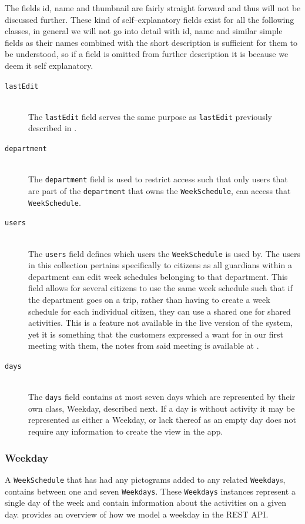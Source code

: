 \noindent
The fields id, name and thumbnail are fairly straight forward and thus will not be discussed further.
These kind of self--explanatory fields exist for all the following classes, in general we will not go into detail with id, name and similar simple fields as their names combined with the short description is sufficient for them to be understood, so if a field is omitted from further description it is because we deem it self explanatory.
\begin{description}
    \item [\texttt{lastEdit}] \hfill \\ 
    The \texttt{lastEdit} field serves the same purpose as \texttt{lastEdit} previously described in .
    \item [\texttt{department}] \hfill \\
    The \texttt{department} field is used to restrict access such that only users that are part of the \texttt{department} that owns the \texttt{WeekSchedule}, can access that \texttt{WeekSchedule}.
    \item [\texttt{users}] \hfill \\
    The \texttt{users} field defines which users the \texttt{WeekSchedule} is used by.
    The users in this collection pertains specifically to citizens as all guardians within a department can edit week schedules belonging to that department.
    This field allows for several citizens to use the same week schedule such that if the department goes on a trip, rather than having to create a week schedule for each individual citizen, they can use a shared one for shared activities.
    This is a feature not available in the live version of the system, yet it is something that the customers expressed a want for in our first meeting with them, the notes from said meeting is available at \citep{GIRAF20161stMeeting}.
    \item [\texttt{days}] \hfill \\
    The \texttt{days} field contains at most seven days which are represented by their own class, Weekday, described next.
    If a day is without activity it may be represented as either a Weekday, or lack thereof as an empty day does not require any information to create the view in the app.
\end{description}

\subsubsection{Weekday}
A \texttt{WeekSchedule} that has had any pictograms added to any related \texttt{Weekday}s, contains between one and seven \texttt{Weekdays}.
These \texttt{Weekdays} instances represent a single day of the week and contain information about the activities on a given day.
 provides an overview of how we model a weekday in the REST API.

